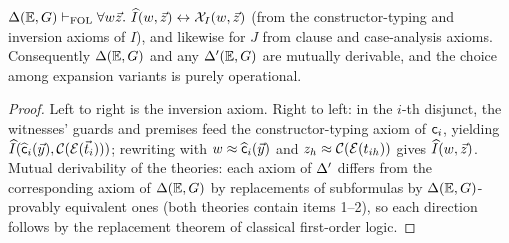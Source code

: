 \begin{proposition}
\label{prop:expansion-derivable}
$\Delta(\mathbb{E},G) \vdash_{\mathrm{FOL}} \forall w \vec{z}.\ \widehat{I}(w,\vec{z})
\leftrightarrow \mathcal{X}_{I}(w,\vec{z})$ (from the constructor-typing and
inversion axioms of $I$), and likewise for $J$ from clause and
case-analysis axioms.  Consequently $\Delta(\mathbb{E},G)$ and any $\Delta'(\mathbb{E},G)$ are
mutually derivable, and the choice among expansion variants is purely
operational.
\end{proposition}

\begin{proof}
Left to right is the inversion axiom.  Right to left: in the $i$-th
disjunct, the witnesses' guards and premises feed the constructor-typing
axiom of $\mathsf{c}_i$, yielding
$\widehat{I}(\widehat{\mathsf{c}}_i(\vec{y}), \mathcal{C}(\mathcal{E}(\vec{t}_i)))$;
rewriting with $w \approx \widehat{\mathsf{c}}_i(\vec{y})$ and $z_h \approx
\mathcal{C}(\mathcal{E}(t_{ih}))$ gives $\widehat{I}(w, \vec{z})$.  Mutual
derivability of the theories: each axiom of $\Delta'$ differs from the
corresponding axiom of $\Delta(\mathbb{E},G)$ by replacements of subformulas by
$\Delta(\mathbb{E},G)$-provably equivalent ones (both theories contain items 1--2), so
each direction follows by the replacement theorem of classical
first-order logic.
\end{proof}


